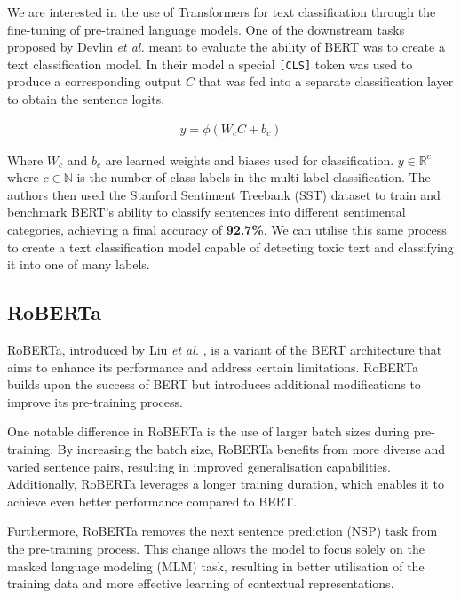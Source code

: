 We are interested in the use of Transformers for text classification through the fine-tuning of pre-trained language models. One of the downstream tasks proposed by Devlin \textit{et al.} meant to evaluate the ability of BERT was to create a text classification model. In their model a special \verb|[CLS]| token was used to produce a corresponding output $C$ that was fed into a separate classification layer to obtain the sentence logits.

\begin{equation}
    \begin{gathered}
        y = \phi\left( W_{c}C+b_{c} \right)
    \end{gathered}
    \label{eq:bert_classification}
\end{equation}

Where $W_{c}$ and $b_{c}$ are learned weights and biases used for classification. $y \in \mathbb{R}^c$ where $c \in \mathbb{N}$ is the number of class labels in the multi-label classification. The authors then used the Stanford Sentiment Treebank (SST) dataset to train and benchmark BERT's ability to classify sentences into different sentimental categories, achieving a final accuracy of \textbf{92.7\%}. We can utilise this same process to create a text classification model capable of detecting toxic text and classifying it into one of many labels.

\subsection{RoBERTa}

RoBERTa, introduced by Liu \textit{et al.} \cite{RoBERTa}, is a variant of the BERT architecture that aims to enhance its performance and address certain limitations. RoBERTa builds upon the success of BERT but introduces additional modifications to improve its pre-training process.

One notable difference in RoBERTa is the use of larger batch sizes during pre-training. By increasing the batch size, RoBERTa benefits from more diverse and varied sentence pairs, resulting in improved generalisation capabilities. Additionally, RoBERTa leverages a longer training duration, which enables it to achieve even better performance compared to BERT.

Furthermore, RoBERTa removes the next sentence prediction (NSP) task from the pre-training process. This change allows the model to focus solely on the masked language modeling (MLM) task, resulting in better utilisation of the training data and more effective learning of contextual representations.

